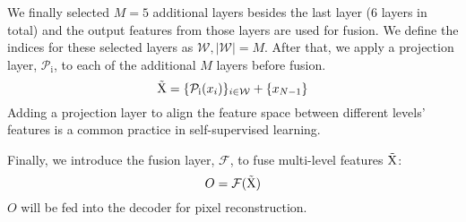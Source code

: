 We finally selected $M=5$ additional layers besides the last layer (6 layers in total) and the output features from those layers are used for fusion. We define the indices for these selected layers as $\mathcal{W}, |\mathcal{W}|=M$.
After that, we apply a projection layer, $\mathcal{P}_\text{i}$, to each of the additional $M$ layers before fusion. 
\begin{equation}
    \label{eq:proj}
    \Tilde{\mathrm{X}} = \{\mathcal{P}_\text{i}(x_i)\}_{i \in \mathcal{W}} + \{x_{N-1}\}
\end{equation}
Adding a projection layer to align the feature space between different levels' features is a common practice in self-supervised learning.

Finally, we introduce the fusion layer, $\mathcal{F}$,  to fuse multi-level features $\Tilde{\mathrm{X}}$:
\begin{equation}
    O = \mathcal{F}(\Tilde{\mathrm{X}})
\end{equation}
$O$ will be fed into the decoder for pixel reconstruction.